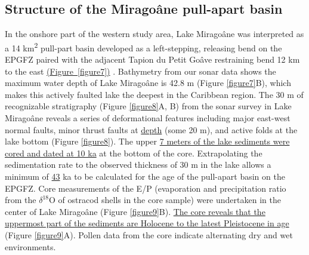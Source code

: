 \documentclass[linenumbers,draft]{agujournal}
\begin{document}
\subsection{Structure of the Mirago\^ane pull-apart basin}
In the onshore part of the western study area, Lake Mirago\^ane was interpreted as a 14 km\textsuperscript{2} pull-part basin developed as a left-stepping, releasing bend on the EPGFZ paired with the adjacent Tapion du Petit Go\^ave restraining bend 12 km to the east \ul{(Figure~{\ref{figure7}})} \citep{cowgill2012interactive}. Bathymetry from our sonar data shows the maximum water depth of Lake Mirago\^ane is 42.8 m (Figure \ref{figure7}B), which makes this actively faulted lake the deepest \citep{higuera199910} in the Caribbean region. The 30 m of recognizable stratigraphy (Figure \ref{figure8}A, B) from the sonar survey in Lake Mirago\^ane reveals a series of deformational features including major east-west normal faults, minor thrust faults at \ul{depth} (some 20 m), and active folds at the lake bottom (Figure \ref{figure8}). The upper \ul{7 meters of the lake sediments were cored and dated at 10 ka} at the bottom of the core. Extrapolating the sedimentation rate to the observed thickness of 30 m in the lake allows a minimum of \ul{43} ka to be calculated for the age of the pull-apart basin on the EPGFZ. Core measurements of the E/P (evaporation and precipitation ratio from the $\delta^{18}$O of ostracod shells in the core sample) were undertaken \citep{higuera199910} in the center of Lake Mirago\^ane (Figure \ref{figure9}B). \ul{The core reveals that the uppermost part of the sediments are Holocene to the latest Pleistocene in age} (Figure \ref{figure9}A). Pollen data from the core indicate alternating dry and wet environments.
\end{document}
